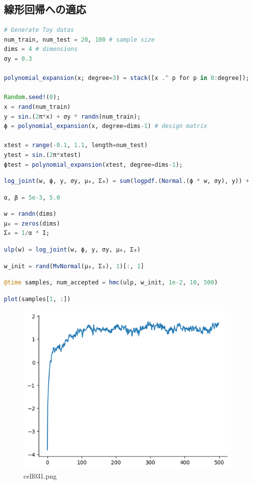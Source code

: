 \subsection{線形回帰への適応}
\begin{lstlisting}[language=julia]
# Generate Toy datas
num_train, num_test = 20, 100 # sample size
dims = 4 # dimensions
σy = 0.3

polynomial_expansion(x; degree=3) = stack([x .^ p for p in 0:degree]);

Random.seed!(0);
x = rand(num_train)
y = sin.(2π*x) + σy * randn(num_train);
ϕ = polynomial_expansion(x, degree=dims-1) # design matrix

xtest = range(-0.1, 1.1, length=num_test)
ytest = sin.(2π*xtest)
ϕtest = polynomial_expansion(xtest, degree=dims-1);
\end{lstlisting}
\begin{lstlisting}[language=julia]
log_joint(w, ϕ, y, σy, μ₀, Σ₀) = sum(logpdf.(Normal.(ϕ * w, σy), y)) + logpdf(MvNormal(μ₀, Σ₀), w);
\end{lstlisting}
\begin{lstlisting}[language=julia]
α, β = 5e-3, 5.0
\end{lstlisting}
\begin{lstlisting}[language=julia]
w = randn(dims)
μ₀ = zeros(dims)
Σ₀ = 1/α * I;
\end{lstlisting}
\begin{lstlisting}[language=julia]
ulp(w) = log_joint(w, ϕ, y, σy, μ₀, Σ₀)
\end{lstlisting}
\begin{lstlisting}[language=julia]
w_init = rand(MvNormal(μ₀, Σ₀), 1)[:, 1]
\end{lstlisting}
\begin{lstlisting}[language=julia]
@time samples, num_accepted = hmc(ulp, w_init, 1e-2, 10, 500)
\end{lstlisting}
\begin{lstlisting}[language=julia]
plot(samples[1, :])
\end{lstlisting}
\begin{figure}[ht]
	\centering
	\includegraphics[scale=0.8, max width=\linewidth]{./fig/bayesian-brain/mcmc/cell031.png}
	\caption{cell031.png}
	\label{cell031.png}
\end{figure}
